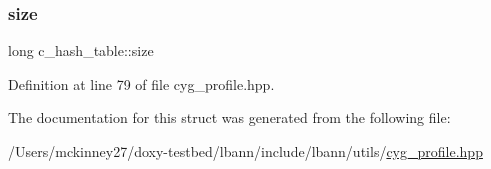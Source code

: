 \mbox{\label{structc__hash__table_afd5bfd9640fc5b72f75457fb7dd89663}} 
\subsubsection{\texorpdfstring{size}{size}}
{\footnotesize\ttfamily long c\+\_\+hash\+\_\+table\+::size}



Definition at line 79 of file cyg\+\_\+profile.\+hpp.



The documentation for this struct was generated from the following file\+:\begin{DoxyCompactItemize}
\item 
/\+Users/mckinney27/doxy-\/testbed/lbann/include/lbann/utils/\hyperlink{cyg__profile_8hpp}{cyg\+\_\+profile.\+hpp}\end{DoxyCompactItemize}
